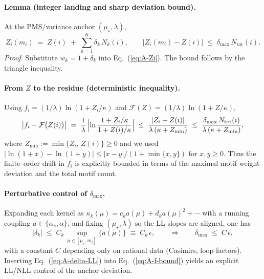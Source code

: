 \documentclass[aps,prd,onecolumn,amsmath,amssymb,superscriptaddress,nofootinbib,showpacs,showkeys]{revtex4-2}
\begin{document}
\paragraph{Lemma (integer landing and sharp deviation bound).}
At the PMS/variance anchor $(\mu_\star,\lambda)$,
\begin{equation}
  Z_i(m_i)\;=\;Z(i)\;+\;\sum_{k=1}^K \delta_k\,N_k(i),
  \qquad
  \bigl|Z_i(m_i)-Z(i)\bigr|\;\le\;\delta_{\max}\,N_{\mathrm{tot}}(i).
  \label{eq:A-int-landing}
\end{equation}
\emph{Proof.} Substitute $w_k=1+\delta_k$ into Eq.~(\ref{eq:A-Zi}). The bound follows by the triangle inequality. %

\paragraph{From $Z$ to the residue (deterministic inequality).}
Using $f_i=(1/\lambda)\ln(1+Z_i/\kappa)$ and $\mathcal F(Z)=(1/\lambda)\ln(1+Z/\kappa)$,
\begin{equation}
  \bigl|f_i-\mathcal F\bigl(Z(i)\bigr)\bigr|
  \;=\;\frac{1}{\lambda}\,\Bigl|\ln\frac{1+Z_i/\kappa}{1+Z(i)/\kappa}\Bigr|
  \;\le\;\frac{|Z_i-Z(i)|}{\lambda\,(\kappa+Z_{\min})}
  \;\le\;\frac{\delta_{\max}\,N_{\mathrm{tot}}(i)}{\lambda\,(\kappa+Z_{\min})},
  \label{eq:A-f-bound}
\end{equation}
where $Z_{\min}:=\min\{Z_i,\,Z(i)\}\ge 0$ and we used $|\ln(1+x)-\ln(1+y)|\le |x-y|/(1+\min\{x,y\})$ for $x,y\ge 0$.
Thus the finite--order drift in $f_i$ is explicitly bounded in terms of the maximal motif weight deviation and the total motif count.

\paragraph{Perturbative control of $\delta_{\max}$.}
Expanding each kernel as $\kappa_k(\mu)=c_k a(\mu)+d_k a(\mu)^2+\cdots$ with a running coupling $a\in\{\alpha_s,\alpha\}$, and fixing $(\mu_\star,\lambda)$ so the LL slopes are aligned, one has
\begin{equation}
  |\delta_k|\;\le\;C_k\,\sup_{\mu\in[\mu_\star,m_i]}\!\bigl\{a(\mu)\bigr\}\;\equiv\;C_k\,\epsilon,
  \qquad\Rightarrow\qquad
  \delta_{\max}\;\le\;C\,\epsilon,
  \label{eq:A-delta-LL}
\end{equation}
with a constant $C$ depending only on rational data (Casimirs, loop factors).
Inserting Eq.~(\ref{eq:A-delta-LL}) into Eq.~(\ref{eq:A-f-bound}) yields an explicit LL/NLL control of the anchor deviation.
\end{document}
